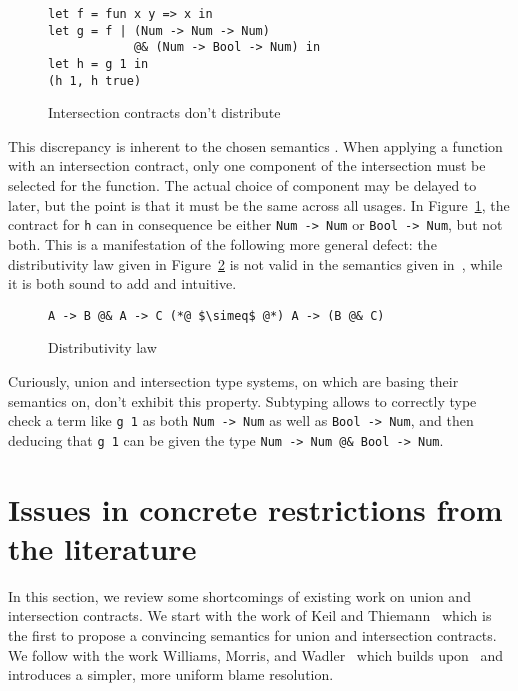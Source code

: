 \documentclass[sigplan,10pt,review,anonymous]{acmart}
\newcommand{\unsure}[2][1=]{}
\newcommand{\info}[2][1=]{}
\newcommand{\nickel}[1]{\lstinline[language=nickel]{#1}}
\begin{document}
\begin{figure}[h]
\begin{lstlisting}[language=nickel]
let f = fun x y => x in
let g = f | (Num -> Num -> Num)
            @& (Num -> Bool -> Num) in
let h = g 1 in
(h 1, h true)
\end{lstlisting}
\caption{Intersection contracts don't distribute}
\label{fig:intersection-distribution}
\end{figure}

This discrepancy is inherent to the chosen semantics .  When applying a function
with an intersection contract, only one component of the intersection must be
selected for the function. The actual choice of component may be delayed to
later, but the point is that it must be the same across all usages. In
Figure~\ref{fig:intersection-distribution}, the contract for \nickel{h} can in
consequence be either \nickel{Num -> Num} or \nickel{Bool -> Num}, but not both.
This is a manifestation of the following more general defect: the distributivity
law given in Figure~\ref{fig:distributivity-law} is not valid in the semantics
given in~\cite{KeilThiemannUnionIntersection}, while it is both sound to add and
intuitive.

\begin{figure}[h]
\begin{lstlisting}[language=nickel]
A -> B @& A -> C (*@ $\simeq$ @*) A -> (B @& C)
\end{lstlisting}
\caption{Distributivity law}
\label{fig:distributivity-law}
\end{figure}

Curiously, union and intersection type systems, on which
\cite{KeilThiemannUnionIntersection} are basing their semantics on, don't
exhibit this property. Subtyping allows to correctly type check a term like
\nickel{g 1} as both \nickel{Num -> Num} as well as
\nickel{Bool -> Num}, and then deducing that \nickel{g 1}
can be given the type \nickel{Num -> Num @& Bool -> Num}.
\unsure{(Yann) I just reworked the wording, but I'm not totally sold on the
argument}

\section{Issues in concrete restrictions from the literature}
\label{sec:issues-literature}
\info{The various papers and the tradeoffs they make}

In this section, we review some shortcomings of existing work on union and
intersection contracts. We start with the work of Keil and
Thiemann~\cite{KeilThiemannUnionIntersection} which is the first to propose a
convincing semantics for union and intersection contracts. We follow with the
work Williams, Morris, and Wadler~\cite{RootCauseOfBlame} which builds
upon~\cite{KeilThiemannUnionIntersection} and introduces a simpler, more
uniform blame resolution.
\end{document}
